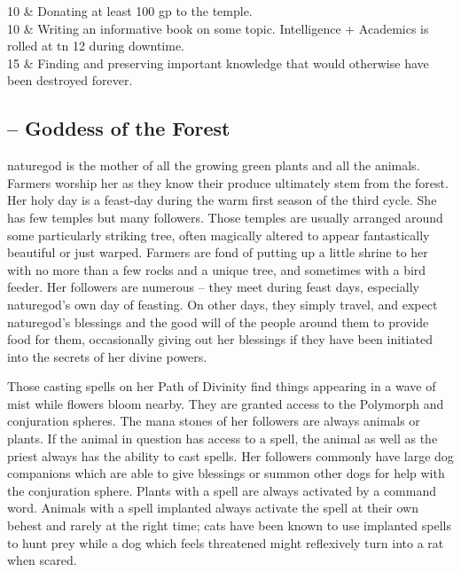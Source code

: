 \begin{multicols}{2}
\begin{xpchart}{}
	10 & Donating at least 100 gp to the temple. \\

	10 & Writing an informative book on some topic. Intelligence + Academics is rolled at \gls{tn} 12 during downtime. \\

	15 & Finding and preserving important knowledge that would otherwise have been destroyed forever. \\

\end{xpchart}

\subsection{ -- Goddess of the Forest}

\noindent
\Gls{naturegod} is the mother of all the growing green plants and all the animals.
Farmers worship her as they know their produce ultimately stem from the forest.
Her holy day is a feast-day during the warm first season of the third cycle.
She has few temples but many followers.
Those temples are usually arranged around some particularly striking tree, often magically altered to appear fantastically beautiful or just warped.
Farmers are fond of putting up a little shrine to her with no more than a few rocks and a unique tree, and sometimes with a bird feeder.
Her followers are numerous -- they meet during feast days, especially \gls{naturegod}'s own day of feasting.
On other days, they simply travel, and expect \gls{naturegod}'s blessings and the good will of the people around them to provide food for them, occasionally giving out her blessings if they have been initiated into the secrets of her divine powers.

Those casting spells on her Path of Divinity find things appearing in a wave of mist while flowers bloom nearby.
They are granted access to the Polymorph and conjuration spheres.
The mana stones of her followers are always animals or plants.
If the animal in question has access to a spell, the animal as well as the priest always has the ability to cast spells.
Her followers commonly have large dog companions which are able to give blessings or summon other dogs for help with the conjuration sphere.
Plants with a spell are always activated by a command word.
Animals with a spell implanted always activate the spell at their own behest and rarely at the right time; cats have been known to use implanted spells to hunt prey while a dog which feels threatened might reflexively turn into a rat when scared.


\end{multicols}
